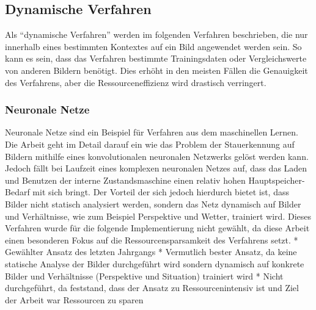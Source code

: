 \subsection{Dynamische Verfahren}
Als "`dynamische Verfahren"' werden im folgenden Verfahren beschrieben, die nur innerhalb eines bestimmten Kontextes auf ein Bild angewendet werden sein. So kann es sein, dass das Verfahren bestimmte Trainingsdaten oder Vergleichswerte von anderen Bildern benötigt. Dies erhöht in den meisten Fällen die Genauigkeit des Verfahrens, aber die Ressourceneffizienz wird drastisch verringert.
\subsubsection{Neuronale Netze}
Neuronale Netze sind ein Beispiel für Verfahren aus dem maschinellen Lernen. 
Die Arbeit \cite{hkkDhbw} geht im Detail darauf ein wie das Problem der Stauerkennung auf Bildern mithilfe eines konvolutionalen neuronalen Netzwerks gelöst werden kann. 
Jedoch fällt bei Laufzeit eines komplexen neuronalen Netzes auf, dass das Laden und Benutzen der interne Zustandsmaschine einen relativ hohen Hauptspeicher-Bedarf mit sich bringt.
Der Vorteil der sich jedoch hierdurch bietet ist, dass Bilder nicht statisch analysiert werden, sondern das Netz dynamisch auf Bilder und Verhältnisse, wie zum Beispiel Perspektive und Wetter, trainiert wird.
Dieses Verfahren wurde für die folgende Implementierung nicht gewählt, da diese Arbeit einen besonderen Fokus auf die Ressourcensparsamkeit des Verfahrens setzt.
* Gewählter Ansatz des letzten Jahrgangs\newline
* Vermutlich bester Ansatz, da keine statische Analyse der Bilder durchgeführt wird\newline
	sondern dynamisch auf konkrete Bilder und Verhältnisse (Perspektive und Situation) trainiert wird
* Nicht durchgeführt, da feststand, dass der Ansatz zu Ressourcenintensiv ist und Ziel der Arbeit war Ressourcen zu sparen\newline

